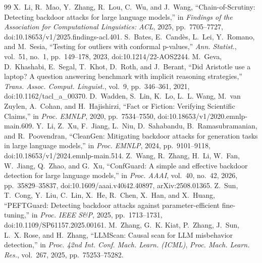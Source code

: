 \documentclass[journal,onecolumn]{IEEEtran}
\begin{document}
\clearpage
\begin{thebibliography}{99}
 X.~Li, R.~Mao, Y.~Zhang, R.~Lou, C.~Wu, and J.~Wang, ``Chain-of-Scrutiny: Detecting backdoor attacks for large language models,'' in \emph{Findings of the Association for Computational Linguistics: ACL}, 2025, pp.~7705--7727, doi:10.18653/v1/2025.findings-acl.401.
 S.~Bates, E.~Cand\`es, L.~Lei, Y.~Romano, and M.~Sesia, ``Testing for outliers with conformal p-values,'' \emph{Ann. Statist.}, vol.~51, no.~1, pp.~149--178, 2023, doi:10.1214/22-AOS2244.
 M.~Geva, D.~Khashabi, E.~Segal, T.~Khot, D.~Roth, and J.~Berant, ``Did Aristotle use a laptop? A question answering benchmark with implicit reasoning strategies,'' \emph{Trans. Assoc. Comput. Linguist.}, vol.~9, pp.~346--361, 2021, doi:10.1162/tacl\_a\_00370.
 D.~Wadden, S.~Lin, K.~Lo, L.~L. Wang, M.~van Zuylen, A.~Cohan, and H.~Hajishirzi, ``Fact or Fiction: Verifying Scientific Claims,'' in \emph{Proc. EMNLP}, 2020, pp.~7534--7550, doi:10.18653/v1/2020.emnlp-main.609.
 Y.~Li, Z.~Xu, F.~Jiang, L.~Niu, D.~Sahabandu, B.~Ramasubramanian, and R.~Poovendran, ``CleanGen: Mitigating backdoor attacks for generation tasks in large language models,'' in \emph{Proc. EMNLP}, 2024, pp.~9101--9118, doi:10.18653/v1/2024.emnlp-main.514.
 Z.~Wang, R.~Zhang, H.~Li, W.~Fan, W.~Jiang, Q.~Zhao, and G.~Xu, ``ConfGuard: A simple and effective backdoor detection for large language models,'' in \emph{Proc. AAAI}, vol.~40, no.~42, 2026, pp.~35829--35837, doi:10.1609/aaai.v40i42.40897, arXiv:2508.01365.
 Z.~Sun, T.~Cong, Y.~Liu, C.~Lin, X.~He, R.~Chen, X.~Han, and X.~Huang, ``PEFTGuard: Detecting backdoor attacks against parameter-efficient fine-tuning,'' in \emph{Proc. IEEE S\&P}, 2025, pp.~1713--1731, doi:10.1109/SP61157.2025.00161.
 M.~Zhang, G.~K. Kiat, P.~Zhang, J.~Sun, L.~X. Rose, and H.~Zhang, ``LLMScan: Causal scan for LLM misbehavior detection,'' in \emph{Proc. 42nd Int. Conf. Mach. Learn. (ICML)}, \emph{Proc. Mach. Learn. Res.}, vol.~267, 2025, pp.~75253--75282.
\end{thebibliography}
\end{document}

